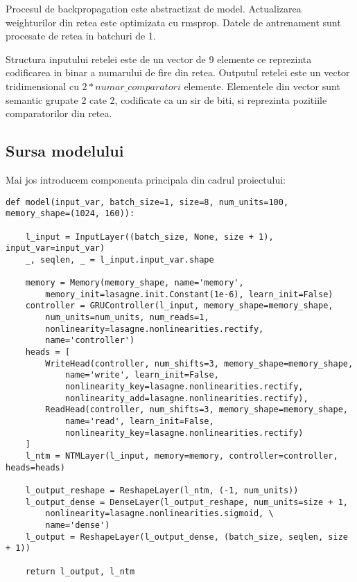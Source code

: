 \documentclass[12pt]{article}
\begin{document}
Procesul de backpropagation este abstractizat de model. Actualizarea weighturilor din retea este optimizata cu rmsprop.
Datele de antrenament sunt procesate de retea in batchuri de 1.

Structura inputului retelei este de un vector de 9 elemente ce reprezinta codificarea in binar a numarului de fire din retea. Outputul retelei este un vector tridimensional cu $2*numar\_comparatori$ elemente. Elementele din vector sunt semantic grupate 2 cate 2, codificate ca un sir de biti, si reprezinta pozitiile comparatorilor din retea. 

\subsection{Sursa modelului}
Mai jos introducem componenta principala din cadrul proiectului:

\begin{center}
\begin{lstlisting}
def model(input_var, batch_size=1, size=8, num_units=100, memory_shape=(1024, 160)):

    l_input = InputLayer((batch_size, None, size + 1), input_var=input_var)
    _, seqlen, _ = l_input.input_var.shape

    memory = Memory(memory_shape, name='memory', 
    	memory_init=lasagne.init.Constant(1e-6), learn_init=False)
    controller = GRUController(l_input, memory_shape=memory_shape,
        num_units=num_units, num_reads=1,
        nonlinearity=lasagne.nonlinearities.rectify,
        name='controller')
    heads = [
        WriteHead(controller, num_shifts=3, memory_shape=memory_shape, 
        	name='write', learn_init=False,
            nonlinearity_key=lasagne.nonlinearities.rectify,
            nonlinearity_add=lasagne.nonlinearities.rectify),
        ReadHead(controller, num_shifts=3, memory_shape=memory_shape, 
        	name='read', learn_init=False,
            nonlinearity_key=lasagne.nonlinearities.rectify)
    ]
    l_ntm = NTMLayer(l_input, memory=memory, controller=controller, heads=heads)

    l_output_reshape = ReshapeLayer(l_ntm, (-1, num_units))
    l_output_dense = DenseLayer(l_output_reshape, num_units=size + 1, 
    	nonlinearity=lasagne.nonlinearities.sigmoid, \
        name='dense')
    l_output = ReshapeLayer(l_output_dense, (batch_size, seqlen, size + 1))

    return l_output, l_ntm
\end{lstlisting}
\end{center}
\end{document}
